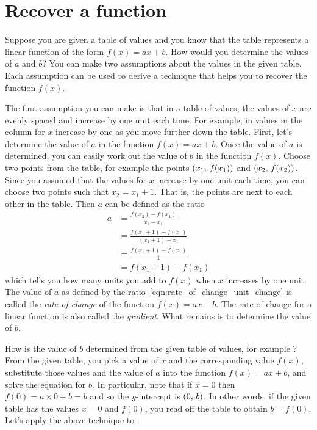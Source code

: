 \documentclass[a4paper,oneside,12pt]{article}
\begin{document}

\section{Recover a function}

Suppose you are given a table of values and you know that the table
represents a linear function of the form $f(x) = ax + b$.  How would
you determine the values of $a$ and $b$?  You can make two assumptions
about the values in the given table.  Each assumption can be used to
derive a technique that helps you to recover the function $f(x)$.

The first assumption you can make is that in a table of values, the
values of $x$ are evenly spaced and increase by one unit each time.
For example, in  values in
the column for $x$ increase by one as you move further down the table.
First, let's determine the value of $a$ in the function $f(x) = ax +
b$.  Once the value of $a$ is determined, you can easily work out the
value of $b$ in the function $f(x)$.  Choose two points from the
table, for example the points $\left\lparen{x_1},\, {f(x_1)}\right\rparen$ and
$\left\lparen{x_2},\, {f(x_2)}\right\rparen$.  Since you assumed that the values for $x$
increase by one unit each time, you can choose two points such that
$x_2 = x_1 + 1$.  That is, the points are next to each other in the
table.  Then $a$ can be defined as the ratio
\begin{equation}
\label{eqn:rate_of_change_unit_change}
\begin{aligned}
a
&=
\frac{
  f(x_2) - f(x_1)
}{
  x_2 - x_1
} \\[4pt]
&=
\frac{
  f(x_1 + 1) - f(x_1)
}{
  (x_1 + 1) - x_1
} \\[4pt]
&=
\frac{
  f(x_1 + 1) - f(x_1)
}{
  1
} \\[4pt]
&=
f(x_1 + 1) - f(x_1)
\end{aligned}
\end{equation}
which tells you how many units you add to $f(x)$ when $x$ increases by
one unit.  The value of $a$ as defined by the
ratio~\eqref{eqn:rate_of_change_unit_change} is called the
\emph{rate of change} of the function $f(x) = ax + b$.  The rate of
change for a linear function is also called the \emph{gradient}.  What
remains is to determine the value of $b$.

How is the value of $b$ determined from the given table of values, for
example ?  From the given
table, you pick a value of $x$ and the corresponding value $f(x)$,
substitute those values and the value of $a$ into the function
$f(x) = ax + b$, and solve the equation for $b$.  In particular, note
that if $x = 0$ then $f(0) = a \times 0 + b = b$ and so the
$y$-intercept is $\left\lparen{0},\, {b}\right\rparen$.  In other words, if the given table
has the values $x = 0$ and $f(0)$, you read off the table to obtain
$b = f(0)$.  Let's apply the above technique to
.
\end{document}
